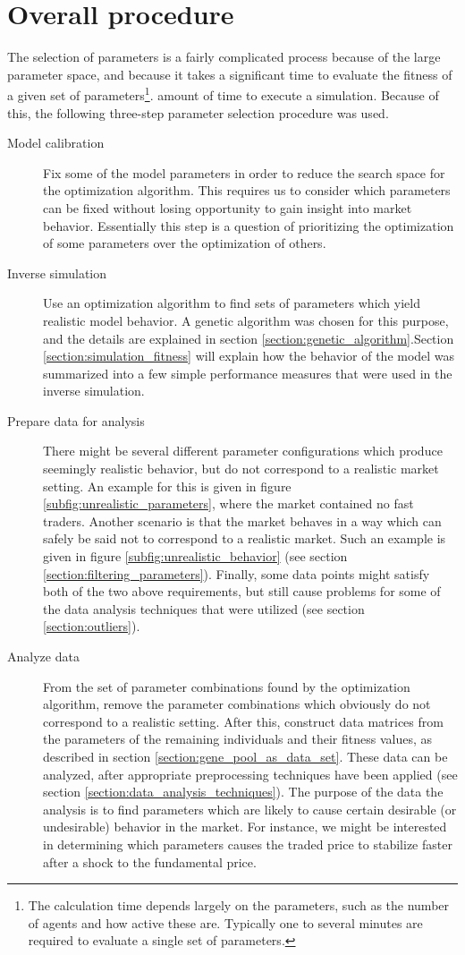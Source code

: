\section{Overall procedure}\label{section:motivation_and_procedure}
The selection of parameters is a fairly complicated process because of the large parameter space, and because it takes a significant time to evaluate the fitness of a given set of parameters\footnote{The calculation time depends largely on the parameters, such as the number of agents and how active these are. Typically one to several minutes are required to evaluate a single set of parameters.}. amount of time to execute a simulation. Because of this, the following three-step parameter selection procedure was used.
\begin{description}
	\item [Model calibration]Fix some of the model parameters in order to reduce the search space for the optimization algorithm. This requires us to consider which parameters can be fixed without losing opportunity to gain insight into market behavior. Essentially this step is a question of prioritizing the optimization of some parameters over the optimization of others. 
	\item[Inverse simulation] Use an optimization algorithm to find sets of parameters which yield realistic model behavior. A genetic algorithm was chosen for this purpose, and the details are explained in section \ref{section:genetic_algorithm}.Section \ref{section:simulation_fitness} will explain how the behavior of the model was summarized into a few simple performance measures that were used in the inverse simulation.
	\item[Prepare data for analysis] There might be several different parameter configurations which produce seemingly realistic behavior, but do not correspond to a realistic market setting. An example for this is given in figure \ref{subfig:unrealistic_parameters}, where the market contained no fast traders. Another scenario is that the market behaves in a way which can safely be said not to correspond to a realistic market. Such an example is given in figure \ref{subfig:unrealistic_behavior} (see section \ref{section:filtering_parameters}). Finally, some data points might satisfy both of the two above requirements, but still cause problems for some of the data analysis techniques that were utilized (see section \ref{section:outliers}).
	\item[Analyze data] From the set of parameter combinations found by the optimization algorithm, remove the parameter combinations which obviously do not correspond to a realistic setting. After this, construct data matrices from the parameters of the remaining individuals and their fitness values, as described in section \ref{section:gene_pool_as_data_set}. These data can be analyzed, after appropriate preprocessing techniques have been applied (see section \ref{section:data_analysis_techniques}). The purpose of the data the analysis is to find parameters which are likely to cause certain desirable (or undesirable) behavior in the market. For instance, we might be interested in determining which parameters causes the traded price to stabilize faster after a shock to the fundamental price. 

\end{description}
